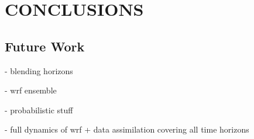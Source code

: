 \chapter{CONCLUSIONS}
\label{chap:conc}

\section{Future Work}

- blending horizons

- wrf ensemble

- probabilistic stuff

- full dynamics of wrf + data assimilation covering all time horizons

